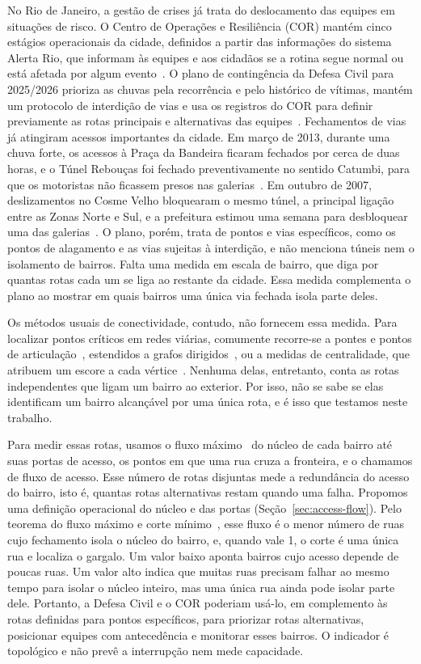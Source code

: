 No Rio de Janeiro, a gestão de crises já trata do deslocamento das equipes em
situações de risco. O Centro de Operações e Resiliência (COR) mantém cinco
estágios operacionais da cidade, definidos a partir das informações do sistema
Alerta Rio, que informam às equipes e aos cidadãos se a rotina segue normal ou
está afetada por algum evento~\cite{rio_plano_contingencia}. O plano de
contingência da Defesa Civil para 2025/2026 prioriza as chuvas pela recorrência
e pelo histórico de vítimas, mantém um protocolo de interdição de vias e usa os
registros do COR para definir previamente as rotas principais e alternativas
das equipes~\cite{rio_plano_contingencia}. Fechamentos de vias já atingiram
acessos importantes da cidade. Em março de 2013, durante uma chuva forte, os
acessos à Praça da Bandeira ficaram fechados por cerca de duas horas, e o Túnel
Rebouças foi fechado preventivamente no sentido Catumbi, para que os motoristas
não ficassem presos nas galerias~\cite{g1_2013}. Em outubro de 2007,
deslizamentos no Cosme Velho bloquearam o mesmo túnel, a principal ligação
entre as Zonas Norte e Sul, e a prefeitura estimou uma semana para desbloquear
uma das galerias~\cite{g1_2007}. O plano, porém, trata de pontos e vias
específicos, como os pontos de alagamento e as vias sujeitas à interdição, e
não menciona túneis nem o isolamento de bairros. Falta uma medida em escala de
bairro, que diga por quantas rotas cada um se liga ao restante da cidade. Essa
medida complementa o plano ao mostrar em quais bairros uma única via fechada
isola parte deles.

Os métodos usuais de conectividade, contudo, não fornecem essa medida. Para
localizar pontos críticos em redes viárias, comumente recorre-se a pontes e
pontos de articulação~\cite{tarjan1972depth}, estendidos a grafos
dirigidos~\cite{italiano2012finding}, ou a medidas de centralidade, que
atribuem um escore a cada
vértice~\cite{alatristasalas2019,kirkley2018betweenness}. Nenhuma delas,
entretanto, conta as rotas independentes que ligam um bairro ao exterior. Por
isso, não se sabe se elas identificam um bairro alcançável por uma única rota,
e é isso que testamos neste trabalho.

Para medir essas rotas, usamos o fluxo máximo~\cite{edmonds1972theoretical} do
núcleo de cada bairro até suas portas de acesso, os pontos em que uma rua cruza
a fronteira, e o chamamos de fluxo de acesso. Esse número de rotas disjuntas
mede a redundância do acesso do bairro, isto é, quantas rotas alternativas
restam quando uma falha. Propomos uma definição operacional do núcleo e das
portas (Seção~\ref{sec:access-flow}). Pelo teorema do fluxo máximo e corte
mínimo~\cite{ford1956maximal}, esse fluxo é o menor número de ruas cujo
fechamento isola o núcleo do bairro, e, quando vale 1, o corte é uma única rua
e localiza o gargalo. Um valor baixo aponta bairros cujo acesso depende de
poucas ruas. Um valor alto indica que muitas ruas precisam falhar ao mesmo
tempo para isolar o núcleo inteiro, mas uma única rua ainda pode isolar parte
dele. Portanto, a Defesa Civil e o COR poderiam usá-lo, em complemento às rotas
definidas para pontos específicos, para priorizar rotas alternativas,
posicionar equipes com antecedência e monitorar esses bairros. O indicador é
topológico e não prevê a interrupção nem mede capacidade.

